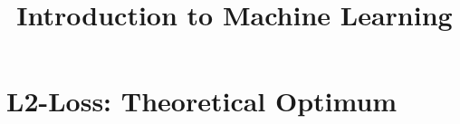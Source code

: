 




\newcommand{\titlefigure}{figure_man/optimization_steps.jpeg}
\newcommand{\learninggoals}{
\item Learn how to derive the theoretical optimizers of the L1 and the L2 loss 
\item Understand the connection between theoretical and the empirical optimizers
}

\title{Introduction to Machine Learning}
\date{}







\section{L2-Loss: Theoretical Optimum}

